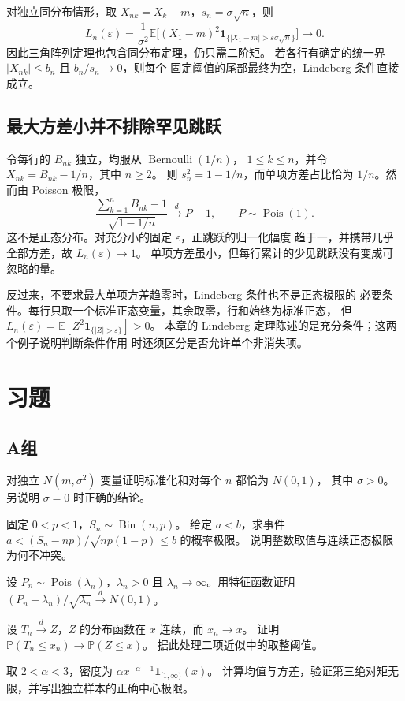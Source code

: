 对独立同分布情形，取 $X_{nk}=X_k-m$，$s_n=\sigma\sqrt n$，则
\[
 L_n(\varepsilon)=\frac1{\sigma^2}
  \mathbb E\bigl[(X_1-m)^2
       \mathbf1_{\{|X_1-m|>\varepsilon\sigma\sqrt n\}}\bigr]\longrightarrow0.
\]
因此三角阵列定理也包含同分布定理，仍只需二阶矩。
若各行有确定的统一界 $|X_{nk}|\le b_n$ 且 $b_n/s_n\to0$，则每个
固定阈值的尾部最终为空，Lindeberg 条件直接成立。

\subsection{最大方差小并不排除罕见跳跃}

令每行的 $B_{nk}$ 独立，均服从 $\operatorname{Bernoulli}(1/n)$，
$1\le k\le n$，并令 $X_{nk}=B_{nk}-1/n$，其中 $n\ge2$。
则 $s_n^2=1-1/n$，而单项方差占比恰为 $1/n$。然而由 Poisson 极限，
\[
 \frac{\sum_{k=1}^nB_{nk}-1}{\sqrt{1-1/n}}
 \xrightarrow d P-1,\qquad P\sim\operatorname{Pois}(1).
\]
这不是正态分布。对充分小的固定 $\varepsilon$，正跳跃的归一化幅度
趋于一，并携带几乎全部方差，故 $L_n(\varepsilon)\to1$。
单项方差虽小，但每行累计的少见跳跃没有变成可忽略的量。

反过来，不要求最大单项方差趋零时，Lindeberg 条件也不是正态极限的
必要条件。每行只取一个标准正态变量，其余取零，行和始终为标准正态，
但 $L_n(\varepsilon)=\mathbb E[Z^2\mathbf1_{\{|Z|>\varepsilon\}}]>0$。
本章的 Lindeberg 定理陈述的是充分条件；这两个例子说明判断条件作用
时还须区分是否允许单个非消失项。

\section*{习题}
\subsection*{A组}
\begin{enumerate}[label=\textbf{\thechapter.\arabic*.}]
对独立 $N(m,\sigma^2)$ 变量证明标准化和对每个 $n$ 都恰为 $N(0,1)$，
其中 $\sigma>0$。另说明 $\sigma=0$ 时正确的结论。

固定 $0<p<1$，$S_n\sim\operatorname{Bin}(n,p)$。
给定 $a<b$，求事件
$a<(S_n-np)/\sqrt{np(1-p)}\le b$ 的概率极限。
说明整数取值与连续正态极限为何不冲突。

设 $P_n\sim\operatorname{Pois}(\lambda_n)$，$\lambda_n>0$ 且
$\lambda_n\to\infty$。用特征函数证明
$(P_n-\lambda_n)/\sqrt{\lambda_n}\xrightarrow dN(0,1)$。

设 $T_n\xrightarrow dZ$，$Z$ 的分布函数在 $x$ 连续，而 $x_n\to x$。
证明 $\mathbb P(T_n\le x_n)\to\mathbb P(Z\le x)$。
据此处理二项近似中的取整阈值。

取 $2<\alpha<3$，密度为
$\alpha x^{-\alpha-1}\mathbf1_{[1,\infty)}(x)$。
计算均值与方差，验证第三绝对矩无限，并写出独立样本的正确中心极限。
\end{enumerate}

